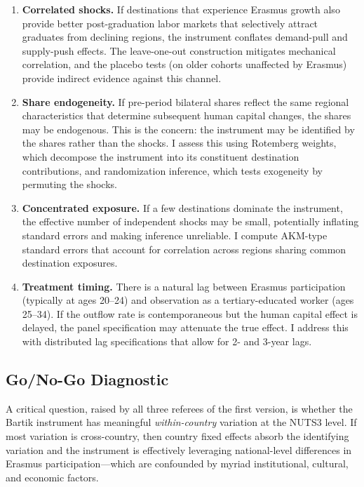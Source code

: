 \documentclass[12pt]{article}
\begin{document}
\begin{enumerate}
\item \textbf{Correlated shocks.} If destinations that experience Erasmus growth also provide better post-graduation labor markets that selectively attract graduates from declining regions, the instrument conflates demand-pull and supply-push effects. The leave-one-out construction mitigates mechanical correlation, and the placebo tests (on older cohorts unaffected by Erasmus) provide indirect evidence against this channel.

\item \textbf{Share endogeneity.} If pre-period bilateral shares reflect the same regional characteristics that determine subsequent human capital changes, the shares may be endogenous. This is the \citet{goldsmith_pinkham_sorkin_swift_2020} concern: the instrument may be identified by the shares rather than the shocks. I assess this using Rotemberg weights, which decompose the instrument into its constituent destination contributions, and randomization inference, which tests exogeneity by permuting the shocks.

\item \textbf{Concentrated exposure.} If a few destinations dominate the instrument, the effective number of independent shocks may be small, potentially inflating standard errors and making inference unreliable. I compute AKM-type standard errors \citep{adao_kolesar_morales_2019} that account for correlation across regions sharing common destination exposures.

\item \textbf{Treatment timing.} There is a natural lag between Erasmus participation (typically at ages 20--24) and observation as a tertiary-educated worker (ages 25--34). If the outflow rate is contemporaneous but the human capital effect is delayed, the panel specification may attenuate the true effect. I address this with distributed lag specifications that allow for 2- and 3-year lags.
\end{enumerate}

\subsection{Go/No-Go Diagnostic}

A critical question, raised by all three referees of the first version, is whether the Bartik instrument has meaningful \emph{within-country} variation at the NUTS3 level. If most variation is cross-country, then country fixed effects absorb the identifying variation and the instrument is effectively leveraging national-level differences in Erasmus participation---which are confounded by myriad institutional, cultural, and economic factors.
\end{document}
